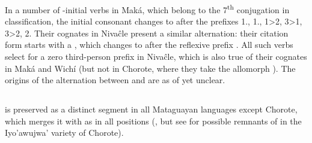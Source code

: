 \begin{exe}
    \ex \foodmn
    \ex \spin
    \ex \ocelot
    \ex \redv
    \ex \heavyv
    \ex \tortoise
    \ex \whitealgarrobof
    \ex \kidney \label{t-kidney}
    \ex \earcw
    \ex \pacu
    \ex \feel
    \ex \heartmn
    \ex \standv
    \ex \yellowv
    \ex \durmili
    \ex \cardon
    \ex \chachalaca
    \ex \utensil
    \ex \vertical
    \ex \bilecw
    \ex \precipice
    \ex \smoke
    \ex \burnvi
    \ex \throwcw
    \ex \cardinal
    \ex \wut
    \ex \cebil
    \ex \orphanmn
    \ex \queenpalmf
    \ex \heartcw
\end{exe}

In a number of -initial verbs in Maká, which belong to the 7\textsuperscript{th} conjugation in  classification, the initial consonant changes to  after the prefixes  1\INCL.\IND,  1\INCL.\NIND,  1>2,  3>1,  3>2,  2\IMP \citep[96, 100, 145]{AG94}. Their cognates in Nivaĉle present a similar alternation: their citation form starts with a , which changes to  after the reflexive prefix  \citep[191, fn. 163]{AF16}. All such verbs select for a zero third-person prefix in Nivaĉle, which is also true of their cognates in Maká and Wichí (but not in Chorote, where they take the allomorph ). The origins of the alternation between  and  are as of yet unclear.

\begin{exe}
    \ex \spend
    \ex \suckb
    \ex \weave
    \ex \shoot
    \ex \carrysh
    \ex \swallow
    \ex \invite
    \ex \dig
    \ex \eatvt
\end{exe}

\subsection{}\label{proto-ts}
 is preserved as a distinct segment in all Mataguayan languages except Chorote, which merges it with  as  in all positions (, but see  for possible remnants of  in the Iyo’awujwa’ variety of Chorote).

\begin{exe}
    \ex \centipede
    \ex \suncho
    \ex \palm
    \ex \oldn
    \ex \chaniart
    \ex \bow
    \ex \quick
    \ex \jabiru
    \ex \eyelash
    \ex \demts
    \ex \chaja
    \ex \duraznillo
    \ex \fullriver
    \ex \tooth
    \ex \tsofa
    \ex \tsofatajf
    \ex \tsofatajt
    \ex \healthy
    \ex \peccary
    \ex \caracara
    \ex \chaguara
\end{exe}

